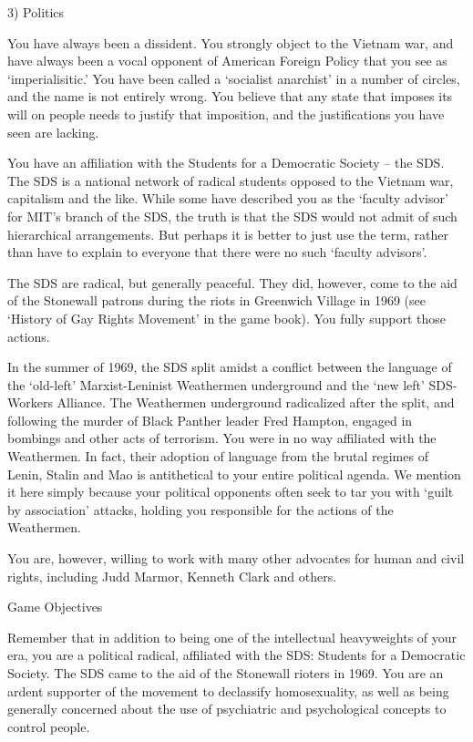 \begin{refsection}
3) Politics

You have always been a dissident. You strongly object to the Vietnam war, and have always been a vocal opponent of American Foreign Policy that you see as ‘imperialisitic.’ You have been called a ‘socialist anarchist’ in a number of circles, and the name is not entirely wrong. You believe that any state that imposes its will on people needs to justify that imposition, and the justifications you have seen are lacking.

You have an affiliation with the Students for a Democratic Society – the SDS. The SDS is a national network of radical students opposed to the Vietnam war, capitalism and the like. While some have described you as the ‘faculty advisor’ for MIT’s branch of the SDS, the truth is that the SDS would not admit of such hierarchical arrangements. But perhaps it is better to just use the term, rather than have to explain to everyone that there were no such ‘faculty advisors’.

The SDS are radical, but generally peaceful. They did, however, come to the aid of the Stonewall patrons during the riots in Greenwich Village in 1969 (see ‘History of Gay Rights Movement’ in the game book). You fully support those actions.

In the summer of 1969, the SDS split amidst a conflict between the language of the ‘old-left’ Marxist-Leninist Weathermen underground and the ‘new left’ SDS-Workers Alliance. The Weathermen underground radicalized after the split, and following the murder of Black Panther leader Fred Hampton, engaged in bombings and other acts of terrorism. You were in no way affiliated with the Weathermen. In fact, their adoption of language from the brutal regimes of Lenin, Stalin and Mao is antithetical to your entire political agenda. We mention it here simply because your political opponents often seek to tar you with ‘guilt by association’ attacks, holding you responsible for the actions of the Weathermen.

You are, however, willing to work with many other advocates for human and civil rights, including Judd Marmor, Kenneth Clark and others.

Game Objectives

Remember that in addition to being one of the intellectual heavyweights of your era, you are a political radical, affiliated with the SDS: Students for a Democratic Society. The SDS came to the aid of the Stonewall rioters in 1969. You are an ardent supporter of the movement to declassify homosexuality, as well as being generally concerned about the use of psychiatric and psychological concepts to control people.


\end{refsection}
